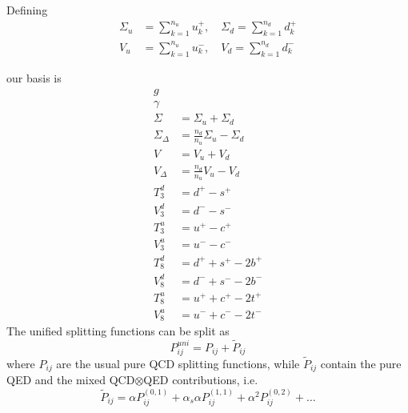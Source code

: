 \documentclass[a4paper,oneside]{article}
\title{}
\author{}
\date{}
\begin{document}
Defining
\begin{align*}
\Sigma_u&=\sum_{k=1}^{n_u}u_k^+,  \quad \Sigma_d=\sum_{k=1}^{n_d}d_k^+ \\
V_u&=\sum_{k=1}^{n_u}u_k^-, \quad V_d=\sum_{k=1}^{n_d}d_k^-
\end{align*}

our basis is
\begin{align*}
g & \\
\gamma & \\
\Sigma &= \Sigma_u + \Sigma_d \\
\Sigma_\Delta & = \frac{n_d}{n_u}\Sigma_u - \Sigma_d \\
V & = V_u + V_d \\
V_\Delta & = \frac{n_d}{n_u}V_u - V_d \\
T_3^d &=d^+ - s^+ \\
V_3^d &=d^- - s^- \\
T_3^u &=u^+ - c^+ \\
V_3^u &=u^- - c^- \\
T_8^d &=d^+ + s^+ - 2b^+ \\
V_8^d &=d^- + s^- - 2b^- \\
T_8^u &=u^+ + c^+ - 2t^+ \\
V_8^u &=u^- + c^- - 2t^-
\end{align*}
The unified splitting functions can be split as
\begin{equation*}
P^{uni}_{ij} = P_{ij}+\tilde{P}_{ij}
\end{equation*}
where $P_{ij}$ are the usual pure QCD splitting functions, while $\tilde{P}_{ij}$ contain the pure QED and the mixed QCD$\otimes$QED contributions, i.e.\
\begin{equation*}
\tilde{P}_{ij} = \alpha P^{(0,1)}_{ij} +\alpha_s \alpha P^{(1,1)}_{ij} + \alpha^2 P^{(0,2)}_{ij} + \dots
\end{equation*}
\end{document}

